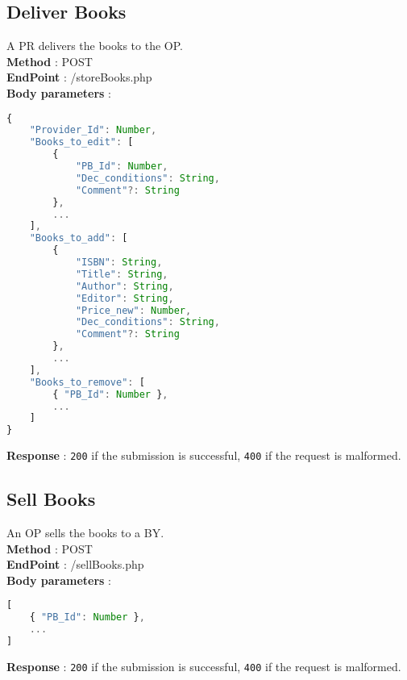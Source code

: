 \subsection{Deliver Books}
A PR delivers the books to the OP.\\
\textbf{Method} : POST \\
\textbf{EndPoint} : /storeBooks.php \\
\textbf{Body parameters} :
\begin{lstlisting}[language=JavaScript, label={lst:jscode}, basicstyle=\ttfamily]
{
    "Provider_Id": Number,
    "Books_to_edit": [
        {
            "PB_Id": Number,
            "Dec_conditions": String,
            "Comment"?: String
        },
        ...
    ],
    "Books_to_add": [
        {
            "ISBN": String,
            "Title": String,
            "Author": String,
            "Editor": String,
            "Price_new": Number,
            "Dec_conditions": String,
            "Comment"?: String
        },
        ...
    ],
    "Books_to_remove": [
        { "PB_Id": Number },
        ...
    ]
}
\end{lstlisting}
\textbf{Response} : \texttt{200} if the submission is successful, \texttt{400} if the request is malformed.

\subsection{Sell Books}
An OP sells the books to a BY.\\
\textbf{Method} : POST \\
\textbf{EndPoint} : /sellBooks.php \\
\textbf{Body parameters} :
\begin{lstlisting}[language=JavaScript, label={lst:jscode}, basicstyle=\ttfamily]
[
    { "PB_Id": Number },
    ...
]
\end{lstlisting}
\textbf{Response} : \texttt{200} if the submission is successful, \texttt{400} if the request is malformed.

